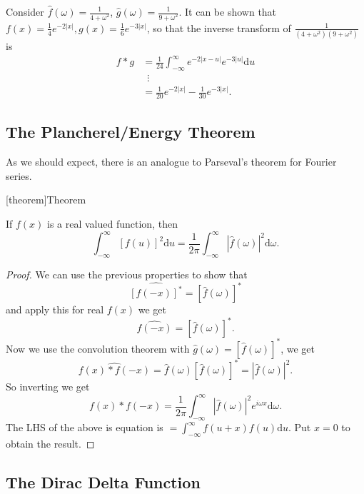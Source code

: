 \documentclass[12pt]{report}
\theoremstyle{definition}
\begin{document}
\begin{ex}
    Consider $\hat{f}(\omega) = \frac{1}{4+\omega^{2}}$, $\hat{g}(\omega) = \frac{1}{9+\omega^{2}}$.
    It can be shown that $f(x) = \frac{1}{4}e^{-2|x|}, g(x) = \frac{1}{6}e^{-3|x|}$,
    so that the inverse transform of $\frac{1}{(4+\omega^{2})(9+\omega^{2})}$ is
    \begin{align*}
        f*g
        & = \frac{1}{24}\int_{-\infty}^{\infty} e^{-2|x-u|}e^{-3|u|}\mathrm{d}u \\
        & \;\:\vdots \\
        & = \frac{1}{20}e^{-2|x|}-\frac{1}{30}e^{-3|x|}.
    \end{align*} 
\end{ex} 

\subsection{The Plancherel/Energy Theorem}

As we should expect, there is an analogue to Parseval's theorem for Fourier series.

[theorem]{Theorem}
\begin{Plancherel Theorem}
    If $f(x)$ is a real valued function, then\[
        \int_{-\infty}^{\infty} {[f(u)]}^{2}\mathrm{d}u
        = \frac{1}{2\pi}\int_{-\infty}^{\infty} {|\hat{f}(\omega)|}^{2}\mathrm{d}\omega.
    \]
    
\end{Plancherel Theorem}

\begin{proof}
We can use the previous properties to show that\[
    \widehat{{[f(-x)]}^{*}} = {[\hat{f}(\omega)]}^{*}
\]and apply this for real $f(x)$ we get\[
\widehat{f(-x)} = {[\hat{f}(\omega)]}^{*}.
\]Now we use the convolution theorem with $\hat{g}(\omega) = {[\hat{f}(\omega)]}^{*}$, we get\[
\widehat{f(x)*f(-x)} = \hat{f}(\omega){[\hat{f}(\omega)]}^{*} = {|\hat{f}(\omega)|}^{2}.
\]So inverting we get\[
f(x)*f(-x) = \frac{1}{2\pi}\int_{-\infty}^{\infty} {|\hat{f}(\omega)|}^{2}e^{i\omega x}\mathrm{d}\omega.
\]
The LHS of the above is equation is $=\int_{-\infty}^{\infty} f(u+x)f(u)\mathrm{d}u$.
Put $x = 0$ to obtain the result.
\end{proof} 

\subsection{The Dirac Delta Function}
\end{document}
